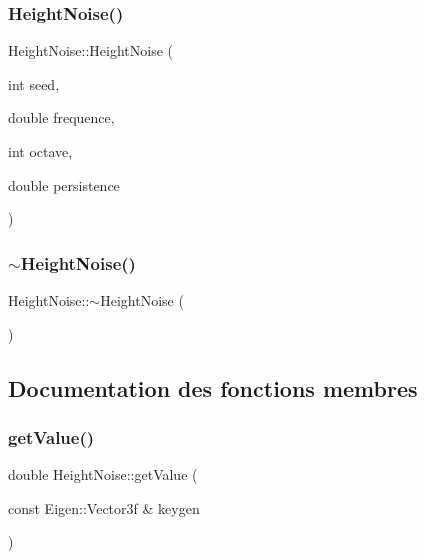 \subsubsection{\texorpdfstring{Height\+Noise()}{HeightNoise()}}
{\footnotesize\ttfamily Height\+Noise\+::\+Height\+Noise (\begin{DoxyParamCaption}\item[{int}]{seed,  }\item[{double}]{frequence,  }\item[{int}]{octave,  }\item[{double}]{persistence }\end{DoxyParamCaption})}

\mbox{\label{class_noise_random_1_1_height_noise_a85d91613d7cc310e928f136680afff22}} 
\subsubsection{\texorpdfstring{$\sim$\+Height\+Noise()}{~HeightNoise()}}
{\footnotesize\ttfamily Height\+Noise\+::$\sim$\+Height\+Noise (\begin{DoxyParamCaption}{ }\end{DoxyParamCaption})}



\subsection{Documentation des fonctions membres}
\mbox{\label{class_noise_random_1_1_height_noise_a0be08d8bcaef1c76a80c45898355d236}} 
\subsubsection{\texorpdfstring{get\+Value()}{getValue()}}
{\footnotesize\ttfamily double Height\+Noise\+::get\+Value (\begin{DoxyParamCaption}\item[{const Eigen\+::\+Vector3f \&}]{keygen }\end{DoxyParamCaption})}



